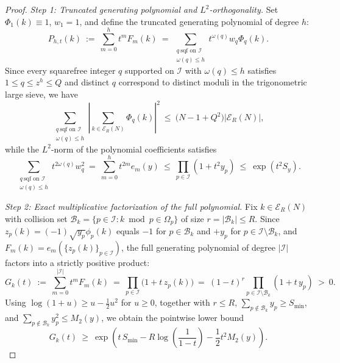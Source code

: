 \documentclass[11pt, a4paper]{article}
\theoremstyle{plain}
\theoremstyle{definition}
\begin{document}
\begin{proof}
\emph{Step 1: Truncated generating polynomial and $L^2$-orthogonality.}
Set $\Phi_1(k)\equiv1$, $w_1=1$, and define the truncated generating polynomial of degree $h$:
$$P_{h,t}(k)\ :=\ \sum_{m=0}^{h}t^{m}F_m(k)\ =\ \sum_{\substack{q\ \text{sqf on }\mathcal{I}\\ \omega(q)\le h}}t^{\omega(q)}w_q\Phi_q(k).$$
Since every squarefree integer $q$ supported on $\mathcal{I}$ with $\omega(q)\le h$ satisfies $1\le q\le z^{h}\le Q$ and distinct $q$ correspond to distinct moduli in the trigonometric large sieve, we have
\begin{equation}\label{eq:gen_poly_ls_ortho}
\sum_{\substack{q\ \text{sqf on }\mathcal{I}\\ \omega(q)\le h}}\left|\sum_{k\in\mathcal{E}_R(N)}\Phi_q(k)\right|^{2}\ \le\ \big(N-1+Q^{2}\big)|\mathcal{E}_R(N)|,
\end{equation}
while the $L^{2}$-norm of the polynomial coefficients satisfies
\begin{equation}\label{eq:gen_poly_weight_norm}
\sum_{\substack{q\ \text{sqf on }\mathcal{I}\\ \omega(q)\le h}}t^{2\omega(q)}w_q^{2}\ =\ \sum_{m=0}^{h}t^{2m}e_m(y)\ \le\ \prod_{p\in\mathcal{I}}(1+t^{2}y_p)\ \le\ \exp(t^{2}S_y).
\end{equation}

\medskip\noindent\emph{Step 2: Exact multiplicative factorization of the full polynomial.}
Fix $k\in\mathcal{E}_R(N)$ with collision set $\mathcal{B}_k=\{p\in\mathcal{I}:k\bmod p\in\Omega_p\}$ of size $r=|\mathcal{B}_k|\le R$. Since $z_p(k)=(-1)\sqrt{y_p}\phi_p(k)$ equals $-1$ for $p\in\mathcal{B}_k$ and $+y_p$ for $p\in\mathcal{I}\setminus\mathcal{B}_k$, and $F_m(k)=e_m(\{z_p(k)\}_{p\in\mathcal{I}})$, the full generating polynomial of degree $|\mathcal{I}|$ factors into a strictly positive product:
\begin{equation}\label{eq:Gk_exact_product}
G_k(t)\ :=\ \sum_{m=0}^{|\mathcal{I}|}t^{m}F_m(k)\ =\ \prod_{p\in\mathcal{I}}\big(1+t\,z_p(k)\big)\ =\ (1-t)^{r}\prod_{p\in\mathcal{I}\setminus\mathcal{B}_k}(1+t\,y_p)\ >\ 0.
\end{equation}
Using $\log(1+u)\ge u-\frac12 u^{2}$ for $u\ge0$, together with $r\le R$, $\sum_{p\notin\mathcal{B}_k}y_p\ge S_{\min}$, and $\sum_{p\notin\mathcal{B}_k}y_p^{2}\le M_2(y)$, we obtain the pointwise lower bound
\begin{equation}\label{eq:Gk_lower_bound}
G_k(t)\ \ge\ \exp\!\left(t\,S_{\min}-R\log\!\left(\frac{1}{1-t}\right)-\frac12 t^{2}M_2(y)\right).
\end{equation}


\end{proof}
\end{document}
